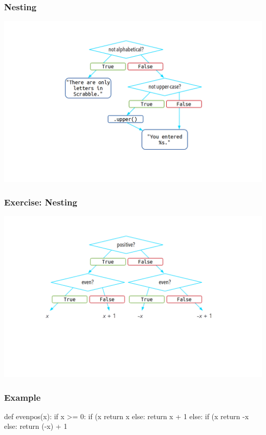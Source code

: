 \documentclass[11pt]{beamer}
\begin{document}
\begin{frame}
  \frametitle{Nesting}
  \includegraphics[width=\textwidth]{./img/control-flow-nesting-else.png}
\end{frame}

\begin{frame}
  \frametitle{Exercise:  Nesting}
  \includegraphics[width=\textwidth]{./img/control-flow-nesting-else-ex.png}
\end{frame}

\begin{frame}[fragile]
  \frametitle{Example}
  \Enlarge

  \begin{semiverbatim}
  def evenpos(x):
if x >= 0:
    if (x%
        return x
    else:
        return x + 1
else:
    if (x%
        return -x
    else:
        return (-x) + 1
  \end{semiverbatim}
\end{frame}
\end{document}
